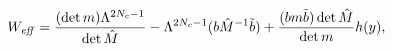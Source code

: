\begin{equation}
  W_{\it eff} = \frac{(\det m) \Lambda^{2N_c-1}}{\det \hat{M}}
  - \Lambda^{2N_c-1} (b{\hat M}^{-1}{\tilde b})
  + \frac{(bm\tilde{b})\det \hat{M}}{\det m} h(y),
\end{equation}


